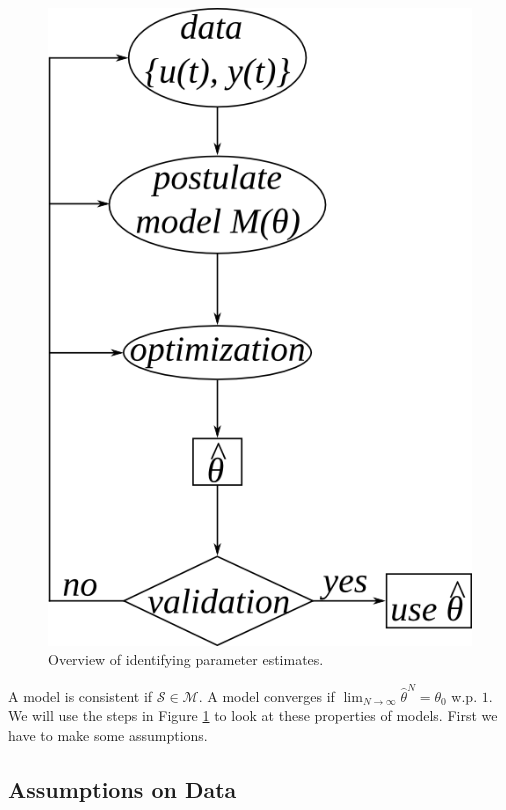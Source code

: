 \begin{figure}[ht!]
	\centering
	\includegraphics[width=.5\textwidth]{images/13overview}
	\caption{Overview of identifying parameter estimates.}
	\label{fig:13overview}
\end{figure}

A model is consistent if $\mathcal{S}\in\mathcal{M}$. A model converges if $\lim_{N\to\infty}\hat{\theta}^N = \theta_0$ w.p. $1$. We will use the steps in Figure \ref{fig:13overview} to look at these properties of models. First we have to make some assumptions.

\subsection{Assumptions on Data}

